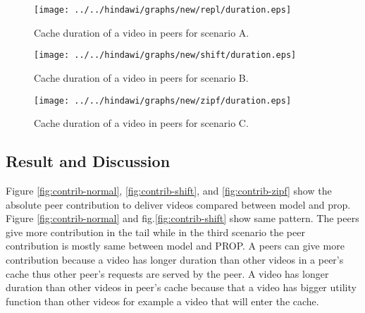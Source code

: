 \begin{figure}[!t]
\begin{center}
\texttt{[image: ../../hindawi/graphs/new/repl/duration.eps]}
\end{center}
\caption{Cache duration of a video in peers for scenario A.}
\label{fig:duration-normal}
\end{figure}

\begin{figure}[!t]
\begin{center}
\texttt{[image: ../../hindawi/graphs/new/shift/duration.eps]}
\end{center}
\caption{Cache duration of a video in peers for scenario B.}
\label{fig:duration-shift}
\end{figure}

\begin{figure}[!t]
\begin{center}
\texttt{[image: ../../hindawi/graphs/new/zipf/duration.eps]}
\end{center}
\caption{Cache duration of a video in peers for scenario C.}
\label{fig:duration-zipf}
\end{figure}


\subsection{Result and Discussion}\label{resultanddiscussion}
Figure \ref{fig:contrib-normal}, \ref{fig:contrib-shift}, and \ref{fig:contrib-zipf} show the absolute peer contribution to deliver videos compared between model and prop. 
Figure \ref{fig:contrib-normal} and fig.\ref{fig:contrib-shift} show same pattern.
The peers give more contribution in the tail while in the third scenario the peer contribution is mostly same between model and PROP. 
A peers can give more contribution because a video has longer duration than other videos in a peer's cache thus other peer's requests are served by the peer. 
A video has longer duration than other videos in peer's cache because that a video has bigger utility function than other videos for example a video that will enter the cache. 


